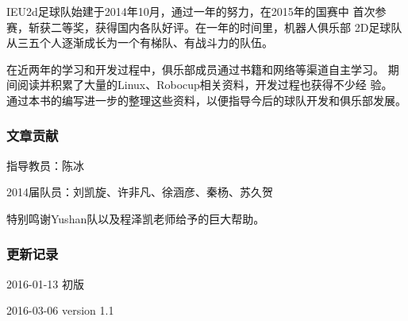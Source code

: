 IEU2d足球队始建于2014年10月，通过一年的努力，在2015年的国赛中
首次参赛，斩获二等奖，获得国内各队好评。在一年的时间里，机器人俱乐部
2D足球队从三五个人逐渐成长为一个有梯队、有战斗力的队伍。

在近两年的学习和开发过程中，俱乐部成员通过书籍和网络等渠道自主学习。
期间阅读并积累了大量的Linux、Robocup相关资料，开发过程也获得不少经
验。
通过本书的编写进一步的整理这些资料，以便指导今后的球队开发和俱乐部发展。

\subsubsection{文章贡献}
\begindot
\item[]
指导教员：陈冰

2014届队员：刘凯旋、许非凡、徐涵彦、秦杨、苏久贺


\myenddot
特别鸣谢Yushan队以及程泽凯老师给予的巨大帮助。
\subsubsection{更新记录}
\begindot
\item[] 2016-01-13 初版
\item[] 2016-03-06 version 1.1
\myenddot
